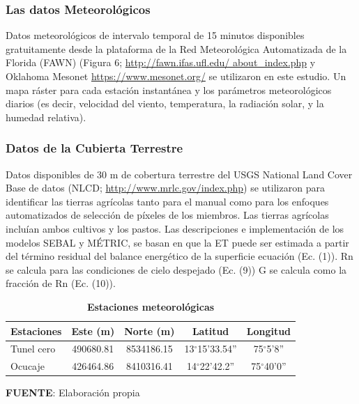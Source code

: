 \subsubsection{Las datos Meteorológicos}

Datos meteorológicos de intervalo temporal de 15 minutos disponibles gratuitamente desde la plataforma de la Red Meteorológica Automatizada de la Florida (FAWN) (Figura 6; \url{http://fawn.ifas.ufl.edu/ about_index.php} y Oklahoma Mesonet  \url{https://www.mesonet.org/} se utilizaron en este estudio. Un mapa ráster para cada estación instantánea y los parámetros meteorológicos diarios (es decir, velocidad del viento, temperatura, la radiación solar, y la humedad relativa).

\subsubsection{Datos de la Cubierta Terrestre}

Datos disponibles de 30 m de cobertura terrestre del USGS National Land Cover Base de datos (NLCD; \url{http://www.mrlc.gov/index.php}) se utilizaron para identificar las tierras agrícolas tanto para el manual como para  los enfoques automatizados de selección de píxeles de los miembros.  Las tierras agrícolas incluían ambos cultivos y los pastos. Las descripciones e implementación de los modelos SEBAL y MÉTRIC, se basan en que la ET puede ser estimada a partir del término residual del balance energético de la superficie ecuación (Ec. (1)). Rn se calcula para las condiciones de cielo despejado (Ec. (9)) G se calcula como la fracción de Rn (Ec. (10)).

\begin{table}[H]
\centering
\begin{threeparttable}
\caption[Estaciones meteorológicas]{\textbf{Estaciones meteorológicas}}
\label{tab:my-tablez}
\begin{tabular}{@{}lcccc@{}}
\hline
Estaciones & Este (m) & Norte (m) & Latitud & Longitud \\ \hline
Tunel cero & 490680.81 & 8534186.15 & 13$^{\circ}$15'33.54'' & 75$^{\circ}$5'8'' \\
Ocucaje & 426464.86 & 8410316.41 & 14$^{\circ}$22'42.2'' & 75$^{\circ}$40'0'' \\ \hline
\end{tabular}
    \begin{tablenotes}
    \vspace{-0.5cm}
      \item {{\fontsize{10pt}{ \baselineskip}\selectfont \textbf{FUENTE}: Elaboración propia}}
    \end{tablenotes}
\end{threeparttable}
\end{table}

